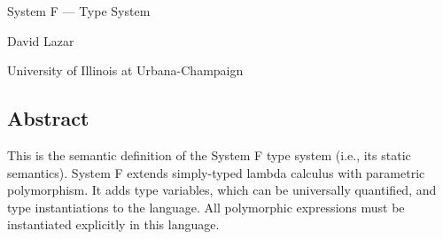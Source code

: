 {\Huge System F --- Type System}
\vspace*{2ex}

{\Large David Lazar}
\vspace*{1ex}

{\large University of Illinois at Urbana-Champaign}

\vspace*{3ex}

\begin{kblock}[text]
\section*{Abstract}
This is the \K semantic definition of the System F type system (i.e., its static semantics). System F extends simply-typed lambda calculus with parametric polymorphism. It adds type variables, which can be universally quantified, and type instantiations to the language. All polymorphic expressions must be instantiated explicitly in this language.
\end{kblock}
